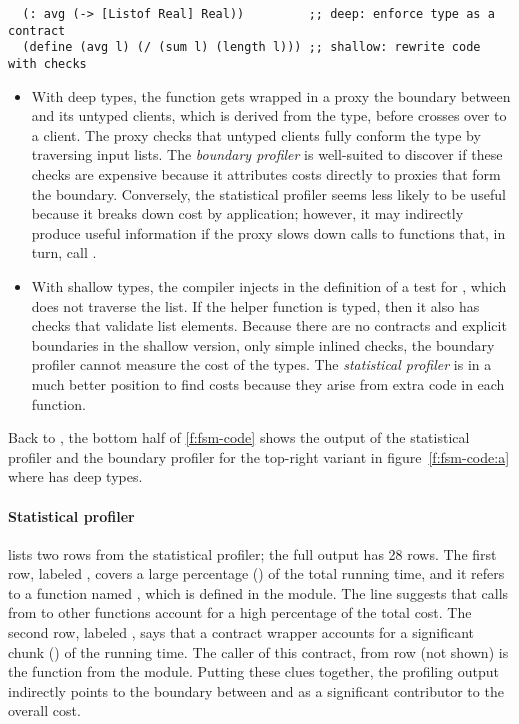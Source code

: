 \begin{verbatim}
  (: avg (-> [Listof Real] Real))         ;; deep: enforce type as a contract
  (define (avg l) (/ (sum l) (length l))) ;; shallow: rewrite code with checks
\end{verbatim}

\begin{itemize}
  \item
    With deep types, the function gets wrapped in a proxy the boundary
    between  and its untyped clients, which is
    derived from the type, before  crosses over to a client.  The
    proxy checks that untyped clients fully conform the type by traversing
    input lists.  The \emph{boundary profiler} is well-suited to
    discover if these checks are expensive because it attributes costs
    directly to proxies that form the boundary.  Conversely, the statistical profiler seems less
    likely to be useful because it breaks down cost by application; however, it
    may indirectly produce useful information if the proxy slows
    down calls to functions that, in turn, call .
  \item
    With shallow types, the compiler injects in the definition of  a test for
    , which does not traverse the list.
    If the helper function  is typed, then it also has checks
    that validate list elements.
    Because there are no contracts and explicit boundaries
    in the shallow version, only simple inlined checks, the
    boundary profiler cannot measure the cost of the types.
    The \emph{statistical profiler} is in a much better position to find
    costs because they arise from extra code in each function.
\end{itemize}

Back to , 
the bottom half of \cref{f:fsm-code} shows the output of the statistical
profiler and the boundary profiler for the top-right variant in
figure~\ref{f:fsm-code:a} where  has deep types.

\paragraph{Statistical profiler}  lists two
rows from the statistical profiler; the full output has 28 rows.  The
first row, labeled \code{[17]}, covers a large percentage () of the
total running time, and it refers to a function named , which is
defined in the  module. The line suggests that calls from
 to other functions account for a high percentage of the total cost.
The second row, labeled \code{[24]}, says that a contract wrapper accounts for a
significant chunk () of the running time.  The caller of this
contract, from row \code{[19]} (not shown) is the function 
from the  module.  Putting these clues together, the profiling output
indirectly points to the boundary between  and  as a significant
contributor to the overall cost. 


